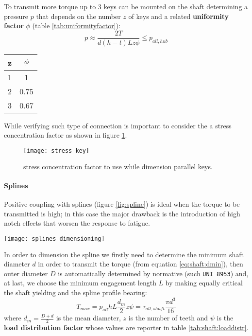 	To transmit more torque up to 3 keys can be mounted on the shaft determining a pressure $p$ that depends on the number $z$ of keys and a related \textbf{uniformity factor} $\phi$ (table \ref{tab:uniformityfactor}):
	\begin{equation}
		p\approx\frac{2T}{d(h-t)Lz\phi} \leq p_{all,hub}
	\end{equation}
		
	\begin{SCtable}[4][bht]
		\centering
		\begin{tabular}{c c}
			z & $\phi$ \\ \hline 1 & 1 \\ 2 & 0.75 \\ 3 & 0.67
		\end{tabular}		
		\caption{Uniformity factor $\phi$ depending on the number $z$ of parallel keys.}	\label{tab:uniformityfactor}
	\end{SCtable}
	
	While verifying such type of connection is important to consider the a stress concentration factor as shown in figure \ref{fig:stresskey}.
	
	\begin{figure}[bht]
		\centering \texttt{[image: stress-key]} 
		\caption{stress concentration factor to use while dimension parallel keys.} \label{fig:stresskey}
	\end{figure}
	
	\paragraph{Splines} Positive coupling with splines (figure \ref{fig:spline}) is ideal when the torque to be transmitted is high; in this case the major drawback is the introduction of high notch effects that worsen the response to fatigue.
	
	\begin{SCfigure}[2] 
		\centering \texttt{[image: splines-dimensioning]}
		\caption{scheme used for the design/verification of a spline positive connection.}
		\label{fig:spline}
	\end{SCfigure} 
	
	In order to dimension the spline we firstly need to determine the minimum shaft diameter $d$ in order to transmit the torque (from equation \ref{eq:shaft:dmin}), then outer diameter $D$ is automatically determined by normative (such \texttt{UNI 8953}) and, at last, we choose the minimum engagement length $L$ by making equally critical the shaft yielding and the spline profile bearing:
	\begin{equation}
		T_{max} = p_{all} h L \frac {d_m}2 z\psi = \tau_{all,shaft} \frac{\pi d^3}{16}
	\end{equation}
	where $d_m = \frac{D+d}{2}$ is the mean diameter, $z$ is the number of teeth and $\psi$ is the \textbf{load distribution factor} whose values are reporter in table \ref{tab:shaft:loaddistr}.
	
